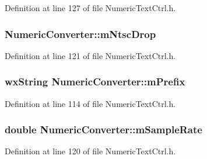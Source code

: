 Definition at line 127 of file Numeric\+Text\+Ctrl.\+h.

\subsubsection[{\texorpdfstring{m\+Ntsc\+Drop}{mNtscDrop}}]{ Numeric\+Converter\+::m\+Ntsc\+Drop\hspace{0.3cm}{\ttfamily [protected]}}\hypertarget{class_numeric_converter_ad16003781c66415fc9da547bf6b292fa}{}\label{class_numeric_converter_ad16003781c66415fc9da547bf6b292fa}


Definition at line 121 of file Numeric\+Text\+Ctrl.\+h.

\subsubsection[{\texorpdfstring{m\+Prefix}{mPrefix}}]{\setlength{\rightskip}{0pt plus 5cm}wx\+String Numeric\+Converter\+::m\+Prefix\hspace{0.3cm}{\ttfamily [protected]}}\hypertarget{class_numeric_converter_ab5741e9903751c8a8ed6f06ede72f659}{}\label{class_numeric_converter_ab5741e9903751c8a8ed6f06ede72f659}


Definition at line 114 of file Numeric\+Text\+Ctrl.\+h.

\subsubsection[{\texorpdfstring{m\+Sample\+Rate}{mSampleRate}}]{\setlength{\rightskip}{0pt plus 5cm}double Numeric\+Converter\+::m\+Sample\+Rate\hspace{0.3cm}{\ttfamily [protected]}}\hypertarget{class_numeric_converter_ab2d5c31502bda8b467b9fdc3771ebb4a}{}\label{class_numeric_converter_ab2d5c31502bda8b467b9fdc3771ebb4a}


Definition at line 120 of file Numeric\+Text\+Ctrl.\+h.

